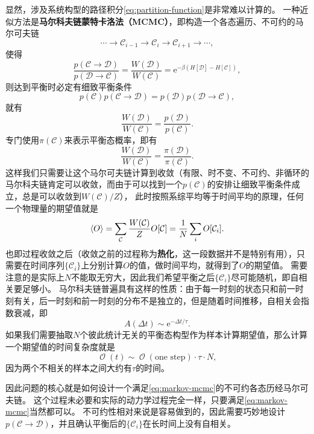 \documentclass[hyperref, UTF8, a4paper]{ctexart}
\newcommand*{\ee}{\mathrm{e}}
\DeclareMathOperator{\bigO}{\mathcal{O}}
\begin{document}
显然，涉及系统构型的路径积分\eqref{eq:partition-function}是非常难以计算的。
一种近似方法是\textbf{马尔科夫链蒙特卡洛法（MCMC）}，即构造一个各态遍历、不可约的马尔可夫链
\[
    \cdots \longrightarrow \mathcal{C}_{i-1} \longrightarrow \mathcal{C}_i \longrightarrow \mathcal{C}_{i+1} \longrightarrow \cdots,
\]
使得
\begin{equation}
    \frac{p(\mathcal{C} \rightarrow \mathcal{D})}{p(\mathcal{D} \rightarrow \mathcal{C})} = \frac{W(\mathcal{D})}{W(\mathcal{C})} = \ee^{-\beta(H[\mathcal{D}]-H[\mathcal{C}])},
    \label{eq:markov-mcmc}
\end{equation}
则达到平衡时必定有细致平衡条件
\[
    p(\mathcal{C}) p(\mathcal{C} \rightarrow \mathcal{D}) = p(\mathcal{D}) p(\mathcal{D} \rightarrow \mathcal{C}),
\]
就有
\[
    \frac{W(\mathcal{D})}{W(\mathcal{C})} = \frac{p(\mathcal{D})}{p(\mathcal{C})}.
\]
专门使用$\pi(\mathcal{C})$来表示平衡态概率，即有
\begin{equation}
    \frac{W(\mathcal{D})}{W(\mathcal{C})} = \frac{\pi(\mathcal{D})}{\pi(\mathcal{C})}.
\end{equation}
这样我们只需要让这个马尔可夫链计算到收敛（有限、时不变、不可约、非循环的马尔科夫链肯定可以收敛，而由于可以找到一个$p(\mathcal{C})$的安排让细致平衡条件成立，总是可以收敛到$W(\mathcal{C})/Z$），
此时按照系综平均等于时间平均的原理，任何一个物理量的期望值就是
\begin{equation}
    \expval{O} = \sum_{\mathcal{C}} \frac{W(\mathcal{C})}{Z} O[\mathcal{C}] = \frac{1}{N} \sum_i O[\mathcal{C}_i].
    \label{eq:classical-expectation}
\end{equation}
也即过程收敛之后（收敛之前的过程称为\textbf{热化}，这一段数据并不是特别有用），只需要在时间序列$\{\mathcal{C}_i\}$上分别计算$O$的值，做时间平均，就得到了$O$的期望值。
需要注意的是实际上$N$不能取无穷大，因此我们希望平衡之后$\{\mathcal{C}_i\}$尽可能随机，即自相关要足够小。
马尔科夫链普遍具有这样的性质：由于每一时刻的状态只和前一时刻有关，后一时刻和前一时刻的分布不是独立的，但是随着时间推移，自相关会指数衰减，即
\begin{equation}
    A(\Delta t) \sim \ee^{- \Delta t / \tau}.
\end{equation}
如果我们需要抽取$N$个彼此统计无关的平衡态构型作为样本计算期望值，那么计算一个期望值的时间复杂度就是
\begin{equation}
    \bigO(t) \sim \bigO(\text{one step}) \cdot \tau \cdot N,
\end{equation}
因为两个不相关的样本之间大约有$\tau$的时间。

因此问题的核心就是如何设计一个满足\eqref{eq:markov-mcmc}的不可约各态历经马尔可夫链。
这个过程未必要和实际的动力学过程完全一样，只要满足\eqref{eq:markov-mcmc}当然都可以。
不可约性相对来说是容易做到的，因此需要巧妙地设计$p(\mathcal{C} \rightarrow \mathcal{D})$，并且确认平衡后的$\{\mathcal{C}_i\}$在长时间上没有自相关。
\end{document}
